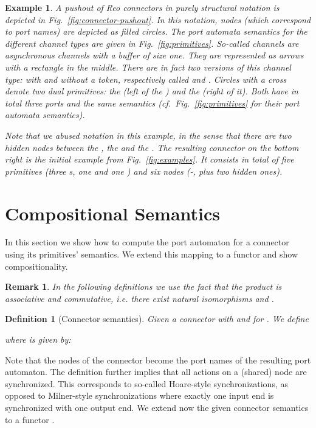 \documentclass[copyright,creativecommons]{eptcs}
\newtheorem{definition}{Definition}
\newtheorem{remark}{Remark}
\newtheorem{example}{Example}
\begin{document}
\begin{example}
A pushout of Reo connectors in purely structural notation is depicted
in Fig.~\ref{fig:connector-pushout}. In this notation, nodes (which correspond
to port names) are depicted as filled circles. The port automata semantics for
the different channel types are given in Fig.~\ref{fig:primitives}.
So-called  channels are asynchronous channels with a buffer of size one.
They are represented as arrows with a rectangle in the middle.
There are in fact two versions of this channel type: with and
without a token, respectively called  and . Circles with a
cross denote two dual primitives: the  (left of the )
and the  (right of it). Both have in total three ports and the same
semantics (cf.~Fig.~\ref{fig:primitives} for their port automata semantics).

Note that we abused notation in this example, in the sense that there are two hidden
nodes between the , the  and the .
The resulting connector on the bottom right is the initial example from
Fig.~\ref{fig:examples}. It consists in total of five primitives (three
s, one  and one ) and six nodes (-, plus two hidden ones).
\end{example}


 
\section{Compositional Semantics}
\label{sec:semantics}

In this section we show how to compute the port automaton for 
a connector using its primitives' semantics. We extend 
this mapping to a functor and show compositionality.

\begin{remark}
In the following definitions we use the fact that the product
is associative and commutative, i.e. there exist
natural isomorphisms  
and .
\end{remark}
\begin{definition}[Connector semantics] 
\label{def:connector-sem}
Given a connector  with  and 
 for . We define
 
where  is given by:

\end{definition}
Note that the nodes of the connector become the port names
of the resulting port automaton. The definition further
implies that all actions on a (shared) node are synchronized. 
This corresponds to so-called Hoare-style synchronizations, as
opposed to Milner-style synchronizations where exactly one
input end is synchronized with one output end.
We extend now the given connector semantics to a functor
.
\end{document}

